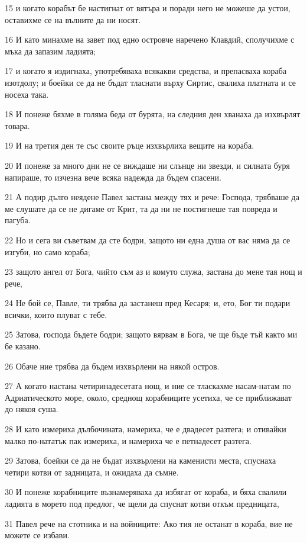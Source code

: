 \par 15 и когато корабът бе настигнат от вятъра и поради него не можеше да устои, оставихме се на вълните да ни носят.
\par 16 И като минахме на завет под едно островче наречено Клавдий, сполучихме с мъка да запазим ладията;
\par 17 и когато я издигнаха, употребяваха всякакви средства, и препасваха кораба изотдолу; и боейки се да не бъдат тласнати върху Сиртис, свалиха платната и се носеха така.
\par 18 И понеже бяхме в голяма беда от бурята, на следния ден хванаха да изхвърлят товара.
\par 19 И на третия ден те със своите ръце изхвърлиха вещите на кораба.
\par 20 И понеже за много дни не се виждаше ни слънце ни звезди, и силната буря напираше, то изчезна вече всяка надежда да бъдем спасени.
\par 21 А подир дълго неядене Павел застана между тях и рече: Господа, трябваше да ме слушате да се не дигаме от Крит, та да ни не постигнеше тая повреда и пагуба.
\par 22 Но и сега ви съветвам да сте бодри, защото ни една душа от вас няма да се изгуби, но само кораба;
\par 23 защото ангел от Бога, чийто съм аз и комуто служа, застана до мене тая нощ и рече,
\par 24 Не бой се, Павле, ти трябва да застанеш пред Кесаря; и, ето, Бог ти подари всички, които плуват с тебе.
\par 25 Затова, господа бъдете бодри; защото вярвам в Бога, че ще бъде тъй както ми бе казано.
\par 26 Обаче ние трябва да бъдем изхвърлени на някой остров.
\par 27 А когато настана четиринадесетата нощ, и ние се тласкахме насам-натам по Адриатическото море, около, среднощ корабниците усетиха, че се приближават до някоя суша.
\par 28 И като измериха дълбочината, намериха, че е двадесет разтега; и отивайки малко по-нататък пак измериха, и намериха че е петнадесет разтега.
\par 29 Затова, боейки се да не бъдат изхвърлени на каменисти места, спуснаха четири котви от задницата, и ожидаха да съмне.
\par 30 И понеже корабниците възнамеряваха да избягат от кораба, и бяха свалили ладията в морето под предлог, че щели да спуснат котви откъм предницата,
\par 31 Павел рече на стотника и на войниците: Ако тия не останат в кораба, вие не можете се избави.

